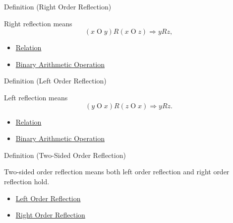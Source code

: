 \begin{definitionbox}{Definition (Right Order Reflection)}
\begin{definition}
\label{def:right-order-reflection}
Right reflection means
\[
(x\mathbin{O}y)R(x\mathbin{O}z) \Longrightarrow yRz,
\]
\end{definition}
\end{definitionbox}

\begin{dependencies}
\begin{itemize}
  \item \hyperref[def:relation]{Relation}
  \item \hyperref[def:binary-arithmetic-operation]{Binary Arithmetic Operation}
\end{itemize}
\end{dependencies}

\begin{definitionbox}{Definition (Left Order Reflection)}
\begin{definition}
\label{def:left-order-reflection}
Left reflection means
\[
(y\mathbin{O}x)R(z\mathbin{O}x) \Longrightarrow yRz.
\]
\end{definition}
\end{definitionbox}

\begin{dependencies}
\begin{itemize}
  \item \hyperref[def:relation]{Relation}
  \item \hyperref[def:binary-arithmetic-operation]{Binary Arithmetic Operation}
\end{itemize}
\end{dependencies}

\begin{definitionbox}{Definition (Two-Sided Order Reflection)}
\begin{definition}
\label{def:two-sided-order-reflection}
Two-sided order reflection means both left order reflection and right order
reflection hold.
\end{definition}
\end{definitionbox}

\begin{dependencies}
\begin{itemize}
  \item \hyperref[def:left-order-reflection]{Left Order Reflection}
  \item \hyperref[def:right-order-reflection]{Right Order Reflection}
\end{itemize}
\end{dependencies}

